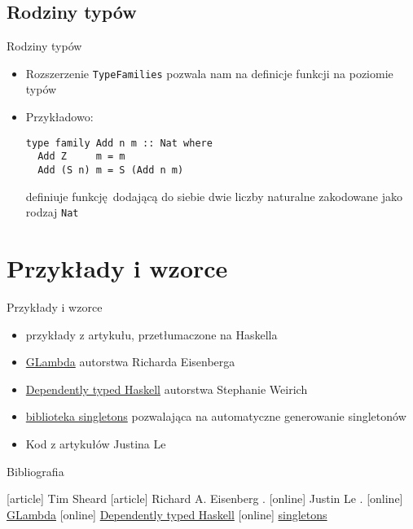 \documentclass{beamer}
\begin{document}
\subsection{Rodziny typów}
\begin{frame}[fragile]{Rodziny typów}
  \begin{itemize}
    \item Rozszerzenie \lstinline{TypeFamilies} pozwala nam na definicje funkcji na poziomie typów
    \item Przykładowo:
\begin{lstlisting}
type family Add n m :: Nat where
  Add Z     m = m
  Add (S n) m = S (Add n m)
\end{lstlisting}
definiuje funkcję dodającą do siebie dwie liczby naturalne zakodowane jako rodzaj \lstinline!Nat!
  \end{itemize}
\end{frame}


\section{Przykłady i wzorce}
\begin{frame}{Przykłady i wzorce}
  \begin{itemize}
    \item przykłady z artykułu, przetłumaczone na Haskella
    \item \href{https://github.com/goldfirere/glambda}{GLambda} autorstwa Richarda Eisenberga
    \item \href{https://github.com/sweirich/dth}{Dependently typed Haskell} autorstwa Stephanie Weirich
    \item \href{https://github.com/goldfirere/singletons}{biblioteka singletons} pozwalająca na automatyczne generowanie singletonów
    \item Kod z artykułów Justina Le
  \end{itemize}
\end{frame}

\begin{frame}{Bibliografia}
  \begin{thebibliography}{10}
		[article]
    	Tim Sheard
		[article]
			Richard A. Eisenberg
			.
		[online]
    	Justin Le
      .
    [online]
        \href{https://github.com/goldfirere/glambda}{GLambda}
    [online]
        \href{https://github.com/sweirich/dth}{Dependently typed Haskell}
    [online]
        \href{https://github.com/goldfirere/singletons}{singletons}
  \end{thebibliography}
\end{frame}
\end{document}
